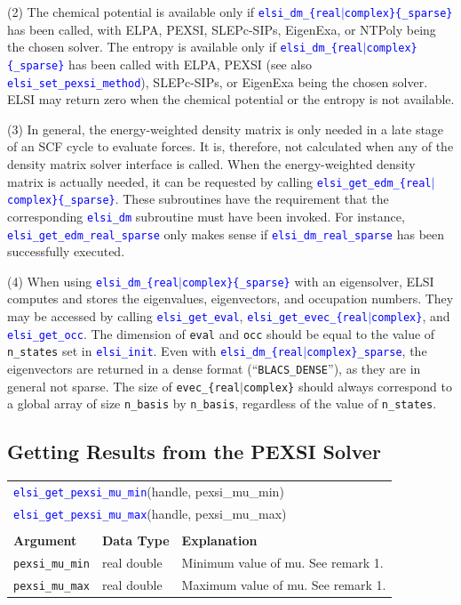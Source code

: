 \documentclass{report}
\newcommand{\api}[1]{\textcolor{blue}{\texttt{#1}}}
\begin{document}
(2) The chemical potential is available only if \api{elsi\_dm\_\{real$\vert$complex\}\{\_sparse\}} has been called, with ELPA, PEXSI, SLEPc-SIPs, EigenExa, or NTPoly being the chosen solver. The entropy is available only if \api{elsi\_dm\_\{real$\vert$complex\}\{\_sparse\}} has been called with ELPA, PEXSI (see also \api{elsi\_set\_pexsi\_method}), SLEPc-SIPs, or EigenExa being the chosen solver. ELSI may return zero when the chemical potential or the entropy is not available.

(3) In general, the energy-weighted density matrix is only needed in a late stage of an SCF cycle to evaluate forces. It is, therefore, not calculated when any of the density matrix solver interface is called. When the energy-weighted density matrix is actually needed, it can be requested by calling \api{elsi\_get\_edm\_\{real$\vert$complex\}\{\_sparse\}}. These subroutines have the requirement that the corresponding \api{elsi\_dm} subroutine must have been invoked. For instance, \api{elsi\_get\_edm\_real\_sparse} only makes sense if \api{elsi\_dm\_real\_sparse} has been successfully executed.

(4) When using \api{elsi\_dm\_\{real$\vert$complex\}\{\_sparse\}} with an eigensolver, ELSI computes and stores the eigenvalues, eigenvectors, and occupation numbers. They may be accessed by calling \api{elsi\_get\_eval}, \api{elsi\_get\_evec\_\{real$\vert$complex\}}, and \api{elsi\_get\_occ}. The dimension of \texttt{eval} and \texttt{occ} should be equal to the value of \texttt{n\_states} set in \api{elsi\_init}. Even with \api{elsi\_dm\_\{real$\vert$complex\}\_sparse}, the eigenvectors are returned in a dense format (``\texttt{BLACS\_DENSE}''), as they are in general not sparse. The size of \texttt{evec\_\{real$\vert$complex\}} should always correspond to a global array of size \texttt{n\_basis} by \texttt{n\_basis}, regardless of the value of \texttt{n\_states}.

\subsection{Getting Results from the PEXSI Solver}
\label{subsec:getter_pexsi}
\begin{tabular}[]{|p{30mm}|p{20mm}|p{112mm}|}
\multicolumn{3}{l}{\api{elsi\_get\_pexsi\_mu\_min}(handle, pexsi\_mu\_min)}\\
\multicolumn{3}{l}{\api{elsi\_get\_pexsi\_mu\_max}(handle, pexsi\_mu\_max)}\\
\multicolumn{3}{l}{}\\
\hline
\multicolumn{1}{|l|}{\textbf{Argument}} & \multicolumn{1}{l|}{\textbf{Data Type}} & \multicolumn{1}{l|}{\textbf{Explanation}}\\
\hline
\texttt{pexsi\_mu\_min} & real double & Minimum value of mu. See remark 1.\\
\hline
\texttt{pexsi\_mu\_max} & real double & Maximum value of mu. See remark 1.\\
\hline
\end{tabular}
\end{document}
